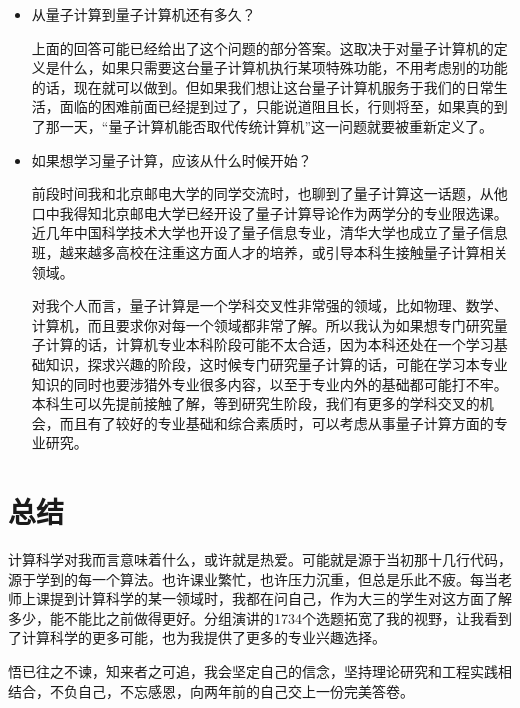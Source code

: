 \documentclass{article}
\begin{document}
\begin{itemize}
    \item 从量子计算到量子计算机还有多久？\par
    上面的回答可能已经给出了这个问题的部分答案。这取决于对量子计算机的定义是什么，如果只需要这台量子计算机执行某项特殊功能，不用考虑别的功能的话，现在就可以做到。但如果我们想让这台量子计算机服务于我们的日常生活，面临的困难前面已经提到过了，只能说道阻且长，行则将至，如果真的到了那一天，“量子计算机能否取代传统计算机”这一问题就要被重新定义了。
    
    \item 如果想学习量子计算，应该从什么时候开始？\par
     前段时间我和北京邮电大学的同学交流时，也聊到了量子计算这一话题，从他口中我得知北京邮电大学已经开设了量子计算导论作为两学分的专业限选课。近几年中国科学技术大学也开设了量子信息专业，清华大学也成立了量子信息班，越来越多高校在注重这方面人才的培养，或引导本科生接触量子计算相关领域。\par
    对我个人而言，量子计算是一个学科交叉性非常强的领域，比如物理、数学、计算机，而且要求你对每一个领域都非常了解。所以我认为如果想专门研究量子计算的话，计算机专业本科阶段可能不太合适，因为本科还处在一个学习基础知识，探求兴趣的阶段，这时候专门研究量子计算的话，可能在学习本专业知识的同时也要涉猎外专业很多内容，以至于专业内外的基础都可能打不牢。本科生可以先提前接触了解，等到研究生阶段，我们有更多的学科交叉的机会，而且有了较好的专业基础和综合素质时，可以考虑从事量子计算方面的专业研究。\par
   
\end{itemize}


\section{总结}
计算科学对我而言意味着什么，或许就是热爱。可能就是源于当初那十几行代码，源于学到的每一个算法。也许课业繁忙，也许压力沉重，但总是乐此不疲。每当老师上课提到计算科学的某一领域时，我都在问自己，作为大三的学生对这方面了解多少，能不能比之前做得更好。分组演讲的1734个选题拓宽了我的视野，让我看到了计算科学的更多可能，也为我提供了更多的专业兴趣选择。\par
悟已往之不谏，知来者之可追，我会坚定自己的信念，坚持理论研究和工程实践相结合，不负自己，不忘感恩，向两年前的自己交上一份完美答卷。\par
\end{document}
